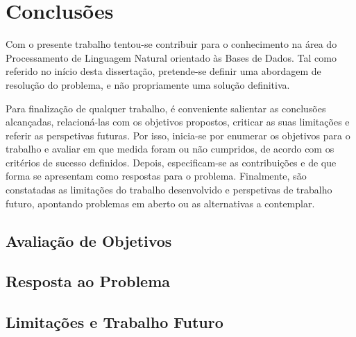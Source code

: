 \chapter{Conclusões}
\label{chap:Chapter7}
Com o presente trabalho tentou-se contribuir para o conhecimento na área do Processamento de Linguagem Natural orientado às Bases de Dados. Tal como referido no início desta dissertação, pretende-se definir uma abordagem de resolução do problema, e não propriamente uma solução definitiva.

Para finalização de qualquer trabalho, é conveniente salientar as conclusões alcançadas, relacioná-las com os objetivos propostos, criticar as suas limitações e referir as perspetivas futuras. Por isso, inicia-se por enumerar os objetivos para o trabalho e avaliar em que medida foram ou não cumpridos, de acordo com os critérios de sucesso definidos. Depois, especificam-se as contribuições e de que forma se apresentam como respostas para o problema. Finalmente, são constatadas as limitações do trabalho desenvolvido e perspetivas de trabalho futuro, apontando problemas em aberto ou as alternativas a contemplar.

\section{Avaliação de Objetivos} 
\label{sec:chap07_goals_evaluation}
\tbd

\section{Resposta ao Problema} 
\label{sec:chap07_problem_response}
\tbd

\section{Limitações e Trabalho Futuro} 
\label{sec:chap07_future_work_limitations}
\tbd
